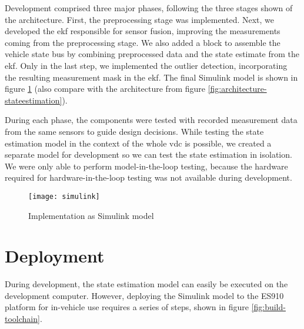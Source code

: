 Development comprised three major phases, following the three stages shown of the architecture. First, the preprocessing stage was implemented. Next, we developed the \gls{ekf} responsible for sensor fusion, improving the measurements coming from the preprocessing stage. We also added a block to assemble the vehicle state bus by combining preprocessed data and the state estimate from the \gls{ekf}. Only in the last step, we implemented the outlier detection, incorporating the resulting measurement mask in the \gls{ekf}. The final Simulink model is shown in figure \ref{fig:simulink} (also compare with the architecture from figure \ref{fig:architecture-stateestimation}).

During each phase, the components were tested with recorded measurement data from the same sensors to guide design decisions. While testing the state estimation model in the context of the whole \gls{vdc} is possible, we created a separate model for development so we can test the state estimation in isolation. We were only able to perform model-in-the-loop testing, because the hardware required for hardware-in-the-loop testing was not available during development.

\begin{figure}
	\centering
	\texttt{[image: simulink]}%
	\caption{Implementation as Simulink model}
	\label{fig:simulink}
\end{figure}


\section{Deployment}
During development, the state estimation model can easily be executed on the development computer. However, deploying the Simulink model to the ES910 platform for in-vehicle use requires a series of steps, shown in figure \ref{fig:build-toolchain}.

